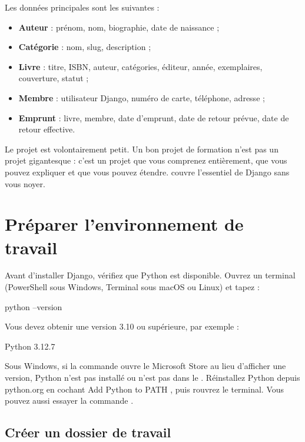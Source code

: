 Les données principales sont les suivantes :
\begin{itemize}
  \item \textbf{Auteur} : prénom, nom, biographie, date de naissance ;
  \item \textbf{Catégorie} : nom, slug, description ;
  \item \textbf{Livre} : titre, ISBN, auteur, catégories, éditeur, année,
        exemplaires, couverture, statut ;
  \item \textbf{Membre} : utilisateur Django, numéro de carte, téléphone, adresse ;
  \item \textbf{Emprunt} : livre, membre, date d'emprunt, date de retour prévue,
        date de retour effective.
\end{itemize}

\begin{bonne}
Le projet est volontairement petit. Un bon projet de formation n'est pas un projet
gigantesque : c'est un projet que vous comprenez entièrement, que vous pouvez
expliquer et que vous pouvez étendre. \gesibiblio{} couvre l'essentiel de Django
sans vous noyer.
\end{bonne}

\section{Préparer l'environnement de travail}

Avant d'installer Django, vérifiez que Python est disponible. Ouvrez un terminal
(PowerShell sous Windows, Terminal sous macOS ou Linux) et tapez :

\begin{terminal}
python --version
\end{terminal}

Vous devez obtenir une version 3.10 ou supérieure, par exemple :

\begin{terminal}
Python 3.12.7
\end{terminal}

\begin{attention}
Sous Windows, si la commande  ouvre le Microsoft Store au lieu
d'afficher une version, Python n'est pas installé ou n'est pas dans le
. Réinstallez Python depuis python.org en cochant \og Add Python to PATH
\fg, puis rouvrez le terminal. Vous pouvez aussi essayer la commande .
\end{attention}

\subsection{Créer un dossier de travail}

